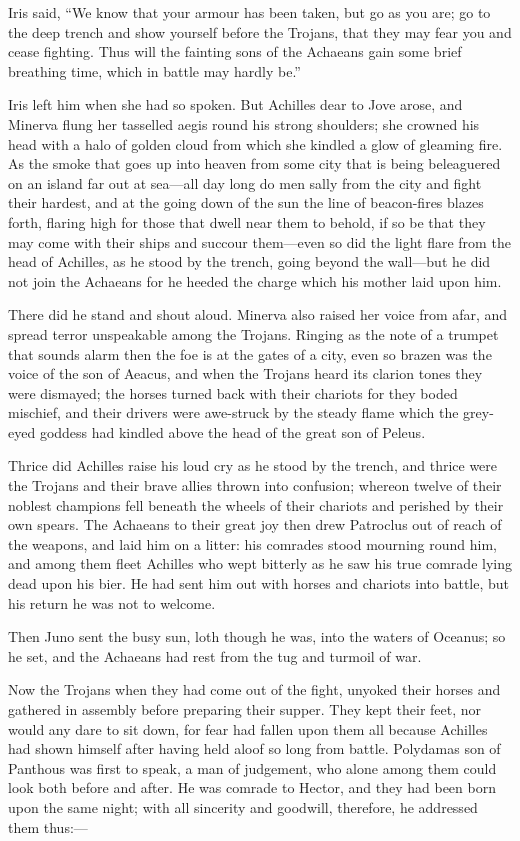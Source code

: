 Iris said, “We know that your armour has been taken, but go as you are; go
to the deep trench and show yourself before the Trojans, that they may
fear you and cease fighting. Thus will the fainting sons of the Achaeans
gain some brief breathing time, which in battle may hardly be.”

Iris left him when she had so spoken. But Achilles dear to Jove arose, and
Minerva flung her tasselled aegis round his strong shoulders; she crowned
his head with a halo of golden cloud from which she kindled a glow of
gleaming fire. As the smoke that goes up into heaven from some city that
is being beleaguered on an island far out at sea—all day long do men
sally from the city and fight their hardest, and at the going down of the
sun the line of beacon-fires blazes forth, flaring high for those that
dwell near them to behold, if so be that they may come with their ships
and succour them—even so did the light flare from the head of
Achilles, as he stood by the trench, going beyond the wall—but he
did not join the Achaeans for he heeded the charge which his mother laid
upon him.

There did he stand and shout aloud. Minerva also raised her voice from
afar, and spread terror unspeakable among the Trojans. Ringing as the note
of a trumpet that sounds alarm then the foe is at the gates of a city,
even so brazen was the voice of the son of Aeacus, and when the Trojans
heard its clarion tones they were dismayed; the horses turned back with
their chariots for they boded mischief, and their drivers were awe-struck
by the steady flame which the grey-eyed goddess had kindled above the head
of the great son of Peleus.

Thrice did Achilles raise his loud cry as he stood by the trench, and
thrice were the Trojans and their brave allies thrown into confusion;
whereon twelve of their noblest champions fell beneath the wheels of their
chariots and perished by their own spears. The Achaeans to their great joy
then drew Patroclus out of reach of the weapons, and laid him on a litter:
his comrades stood mourning round him, and among them fleet Achilles who
wept bitterly as he saw his true comrade lying dead upon his bier. He had
sent him out with horses and chariots into battle, but his return he was
not to welcome.

Then Juno sent the busy sun, loth though he was, into the waters of
Oceanus; so he set, and the Achaeans had rest from the tug and turmoil of
war.

Now the Trojans when they had come out of the fight, unyoked their horses
and gathered in assembly before preparing their supper. They kept their
feet, nor would any dare to sit down, for fear had fallen upon them all
because Achilles had shown himself after having held aloof so long from
battle. Polydamas son of Panthous was first to speak, a man of judgement,
who alone among them could look both before and after. He was comrade to
Hector, and they had been born upon the same night; with all sincerity and
goodwill, therefore, he addressed them thus:—


